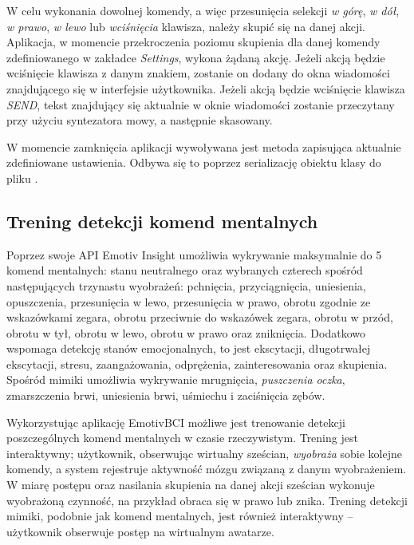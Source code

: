 \documentclass[skorowidz,skroty]{dyplomWEZUT}
\begin{document}
W celu wykonania dowolnej komendy, a więc przesunięcia selekcji \textit{w górę}, \textit{w dół}, \textit{w prawo}, \textit{w lewo} lub \textit{wciśnięcia} klawisza, należy skupić się na danej akcji. Aplikacja, w momencie przekroczenia poziomu skupienia dla danej komendy zdefiniowanego w zakładce \textit{Settings}, wykona żądaną akcję. Jeżeli akcją będzie wciśnięcie klawisza z danym znakiem, zostanie on dodany do okna wiadomości znajdującego się w interfejsie użytkownika. Jeżeli akcją będzie wciśnięcie klawisza \textit{SEND}, tekst znajdujący się aktualnie w oknie wiadomości zostanie przeczytany przy użyciu syntezatora mowy, a następnie skasowany.

W momencie zamknięcia aplikacji wywoływana jest metoda zapisująca aktualnie zdefiniowane ustawienia. Odbywa się to poprzez serializację obiektu klasy  do pliku .


\subsection{Trening detekcji komend mentalnych}
Poprzez swoje API Emotiv Insight umożliwia wykrywanie maksymalnie do 5 komend mentalnych: stanu neutralnego oraz wybranych czterech spośród następujących trzynastu wyobrażeń: pchnięcia, przyciągnięcia, uniesienia, opuszczenia, przesunięcia w lewo, przesunięcia w prawo, obrotu zgodnie ze wskazówkami zegara, obrotu przeciwnie do wskazówek zegara, obrotu w przód, obrotu w tył, obrotu w lewo, obrotu w prawo oraz zniknięcia. Dodatkowo wspomaga detekcję stanów emocjonalnych, to jest ekscytacji, długotrwałej ekscytacji, stresu, zaangażowania, odprężenia, zainteresowania oraz skupienia. Spośród mimiki umożliwia wykrywanie mrugnięcia, \textit{puszczenia oczka}, zmarszczenia brwi, uniesienia brwi, uśmiechu i zaciśnięcia zębów.

Wykorzystując aplikację EmotivBCI możliwe jest trenowanie detekcji poszczególnych komend mentalnych w czasie rzeczywistym. Trening jest interaktywny; użytkownik, obserwując wirtualny sześcian, \textit{wyobraża} sobie kolejne komendy, a system rejestruje aktywność mózgu związaną z danym wyobrażeniem. W miarę postępu oraz nasilania skupienia na danej akcji sześcian wykonuje wyobrażoną czynność, na przykład obraca się w prawo lub znika. Trening detekcji mimiki, podobnie jak komend mentalnych, jest również interaktywny -- użytkownik obserwuje postęp na wirtualnym awatarze. 
\end{document}
